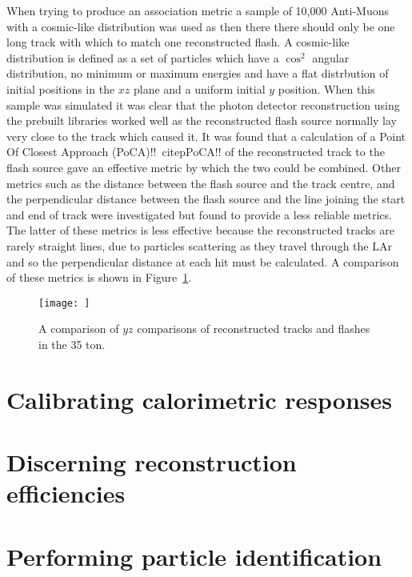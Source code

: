 When trying to produce an association metric a sample of 10,000 Anti-Muons with a cosmic-like distribution was used as then there there should only be one long track with which to match one reconstructed flash. A cosmic-like distribution is defined as a set of particles which have a $\cos^{2}$ angular distribution, no minimum or maximum energies and have a flat distrbution of initial positions in the $xz$ plane and a uniform initial $y$ position. When this sample was simulated it was clear that the photon detector reconstruction using the prebuilt libraries worked well as the reconstructed flash source normally lay very close to the track which caused it. It was found that a calculation of a Point Of Closest Approach (PoCA)!!~citep{PoCA}!! of the reconstructed track to the flash source gave an effective metric by which the two could be combined. Other metrics such as the distance between the flash source and the track centre, and the perpendicular distance between the flash source and the line joining the start and end of track were investigated but found to provide a less reliable metrics. The latter of these metrics is less effective because the reconstructed tracks are rarely straight lines, due to particles scattering as they travel through the LAr and so the perpendicular distance at each hit must be calculated. A comparison of these metrics is shown in Figure~\ref{fig:PDYZDist}.

\begin{figure}[h!]
  \centering
  \texttt{[image: ]}
  \caption[A comparison of $yz$ comparisons of reconstructed tracks and flashes in the 35 ton]
          {A comparison of $yz$ comparisons of reconstructed tracks and flashes in the 35 ton.}
  \label{fig:PDYZDist}
\end{figure}

\section{Calibrating calorimetric responses}  %

\section{Discerning reconstruction efficiencies} \label{sec:SimRecoEffic} %

\section{Performing particle identification}  %

